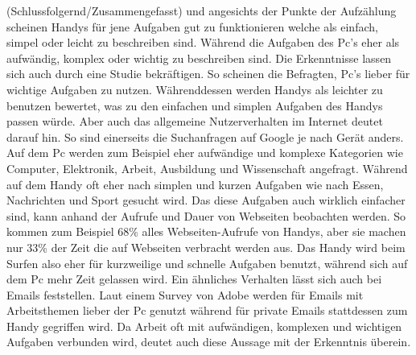 \myNewSection%
(Schlussfolgernd/Zusammengefasst) und angesichts der Punkte der Aufzählung scheinen Handys für jene Aufgaben gut zu funktionieren welche als einfach, simpel oder leicht zu beschreiben sind. Während die Aufgaben des Pc's eher als aufwändig, komplex oder wichtig zu beschreiben sind.\newline%
	Die Erkenntnisse lassen sich auch durch eine Studie bekräftigen. So scheinen die Befragten, Pc's lieber für wichtige Aufgaben zu nutzen. Währenddessen werden Handys als leichter zu benutzen bewertet, was zu den einfachen und simplen Aufgaben des Handys passen würde\cite{pcVsphone_easyUseVsImportantTask}.\newline%
	Aber auch das allgemeine Nutzerverhalten im Internet deutet darauf hin.
		So sind einerseits die Suchanfragen auf Google je nach Gerät anders. Auf dem Pc werden zum Beispiel eher aufwändige und komplexe Kategorien wie Computer, Elektronik, Arbeit, Ausbildung und Wissenschaft angefragt. Während auf dem Handy oft eher nach simplen und kurzen Aufgaben wie nach Essen, Nachrichten und Sport gesucht wird\cite{pcVsphone_onWebsites_DevicesDistrubition_TimeSpent_Bouncrate_PageViews_Categories}.\newline%
			Das diese Aufgaben auch wirklich einfacher sind, kann anhand der Aufrufe und Dauer von Webseiten beobachten werden. So kommen zum Beispiel 68\% alles Webseiten-Aufrufe von Handys, aber sie machen nur 33\% der Zeit die auf Webseiten verbracht werden aus\cite{pcVsphone_onWebsites_DevicesDistrubition_TimeSpent_Bouncrate_PageViews_Categories}.\newline%
		Das Handy wird beim Surfen also eher für kurzweilige und schnelle Aufgaben benutzt, während sich auf dem Pc mehr Zeit gelassen wird.\newline%
		Ein ähnliches Verhalten lässt sich auch bei Emails feststellen. Laut einem Survey von Adobe werden für Emails mit Arbeitsthemen lieber der Pc genutzt während für private Emails stattdessen zum Handy gegriffen wird. Da Arbeit oft mit aufwändigen, komplexen und wichtigen Aufgaben verbunden wird, deutet auch diese Aussage mit der Erkenntnis überein\cite{pcVsphone_personalEmailsVsWorkEmails}.